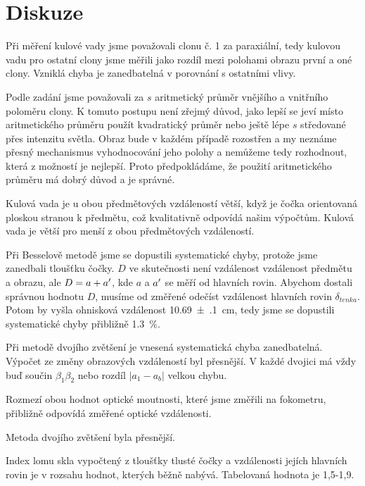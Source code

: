 \section*{Diskuze}
Při měření kulové vady jsme považovali clonu č. 1 za paraxiální, tedy kulovou vadu pro ostatní clony jsme měřili jako rozdíl mezi polohami obrazu první a oné clony. Vzniklá chyba je zanedbatelná v porovnání s ostatními vlivy.

Podle zadání jsme považovali za $s$ aritmetický průměr vnějšího a vnitřního poloměru clony. K tomuto postupu není zřejmý důvod, jako lepší se jeví místo aritmetického průměru použít kvadratický průměr nebo ještě lépe $s$ středované přes intenzitu světla. Obraz bude v každém případě rozostřen a my neznáme přesný mechanismus vyhodnocování jeho polohy a nemůžeme tedy rozhodnout, která z možností je nejlepší. Proto předpokládáme, že použití aritmetického průměru má dobrý důvod a je správné.

Kulová vada je u obou předmětových vzdáleností větší, když je čočka orientovaná ploskou stranou k předmětu, což kvalitativně odpovídá našim výpočtům. Kulová vada je větší pro menší z obou předmětových vzdáleností.

Při Besselově metodě jsme se dopustili systematické chyby, protože jsme zanedbali tloušťku čočky. $D$ ve skutečnosti není vzdálenost vzdálenost předmětu a obrazu, ale $D=a+a^\prime$, kde $a$ a $a^\prime$ se měří od hlavních rovin. Abychom dostali správnou hodnotu $D$, musíme od změřené odečíst vzdálenost hlavních rovin $\delta_{tenka}$. Potom by vyšla ohnisková vzdálenost \SI{10.69(10)}{\cm}, tedy jsme se dopustili systematické chyby přibližně \SI{1.3}{\percent}.

Při metodě dvojího zvětšení je vnesená systematická chyba zanedbatelná. Výpočet ze změny obrazových vzdáleností byl přesnější. V každé dvojici má vždy buď součin $\beta_1\beta_2$ nebo rozdíl $\left|a_1-a_b\right|$ velkou chybu.

Rozmezí obou hodnot optické moutnosti, které jsme změřili na fokometru, přibližně odpovídá změřené optické vzdálenosti.

Metoda dvojího zvětšení byla přesnější.

Index lomu skla vypočtený z tloušťky tlusté čočky a vzdálenosti jejích hlavních rovin je v rozsahu hodnot, kterých běžně nabývá. Tabelovaná hodnota je 1,5-1,9.